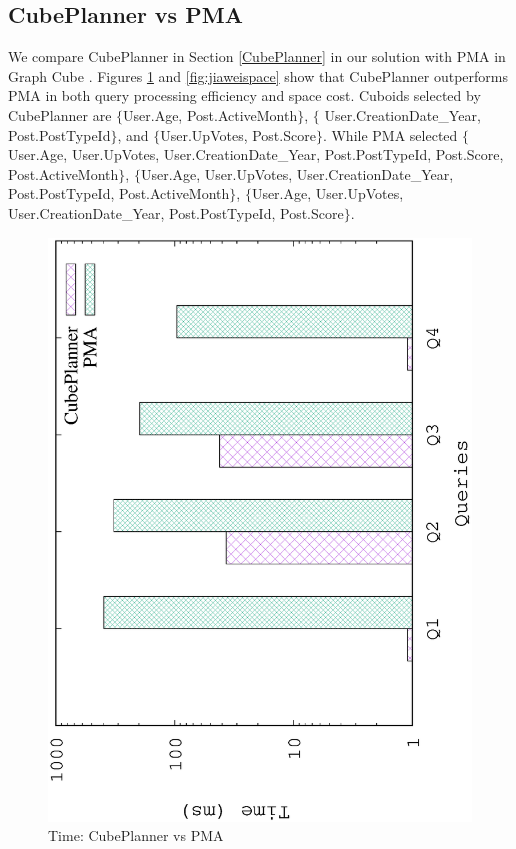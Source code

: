 	\subsection{CubePlanner vs PMA}
	\label{CubePlannerPMA}
	We compare CubePlanner in Section \ref{CubePlanner} in our solution with PMA in Graph Cube \cite{DBLP:conf/sigmod/ZhaoLXH11}. Figures \ref{fig:qjiawei} and \ref{fig:jiaweispace} show that CubePlanner outperforms PMA in both query processing efficiency and space cost. Cuboids selected by CubePlanner are $\{$User.Age, Post.ActiveMonth$\}$, $\{$ User.CreationDate\_Year, Post.PostTypeId$\}$, and $\{$User.UpVotes, Post.Score$\}$. While PMA selected $\{$User.Age, User.UpVotes, User.CreationDate\_Year, Post.PostTypeId, Post.Score, Post.ActiveMonth$\}$, $\{$User.Age, User.UpVotes, User.CreationDate\_Year, Post.PostTypeId, Post.ActiveMonth$\}$, $\{$User.Age, User.UpVotes, User.CreationDate\_Year, Post.PostTypeId, Post.Score$\}$.


\begin{figure}[H]
	\centering
	\includegraphics[scale=0.47, angle=270]{plot/qjiawei.eps}
	\caption{Time: CubePlanner vs PMA}
	\label{fig:qjiawei}
\end{figure}

